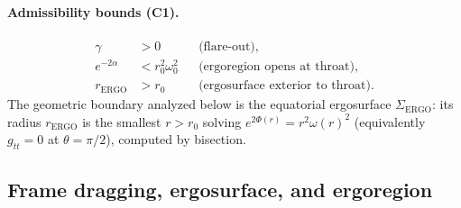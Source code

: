 \documentclass{iopjournal}
\newcommand{\Phir}{\Phi(r)}
\newcommand{\omegar}{\omega(r)}
\theoremstyle{remark}
\begin{document}
\paragraph{Admissibility bounds (C1).}
\begin{align}
\label{eq:bounds}
\gamma &> 0
&& \text{(flare-out)}, \nonumber\\
e^{-2\alpha} &< r_{0}^{2}\omega_{0}^{2}
&& \text{(ergoregion opens at throat)}, \nonumber\\
r_{\mathrm{ERGO}} &> r_{0}
&& \text{(ergosurface exterior to throat)}.
\end{align}
The geometric boundary analyzed below is the equatorial ergosurface $\Sigma_{\mathrm{ERGO}}$: its radius $r_{\mathrm{ERGO}}$ is the smallest $r>r_{0}$ solving $e^{2\Phir}=r^{2}\omegar^{2}$ (equivalently $g_{tt}=0$ at $\theta=\pi/2$), computed by bisection.

\subsection{Frame dragging, ergosurface, and ergoregion}
\end{document}
